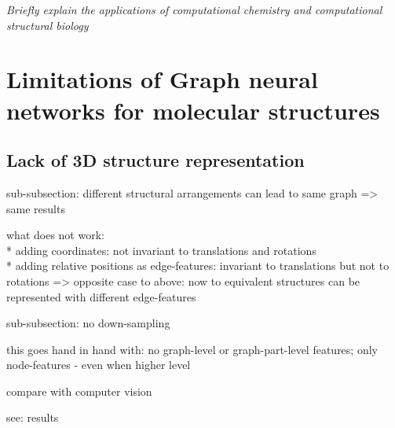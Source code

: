 \textit{Briefly explain the applications of computational chemistry and computational structural biology} 


\section{Limitations of Graph neural networks for molecular structures}

\subsection{Lack of 3D structure representation}

{\itshape
	
sub-subsection: different structural arrangements can lead to same graph => same results

what does not work:\\
* adding coordinates: not invariant to translations and rotations\\
* adding relative positions as edge-features: invariant to translations but not to rotations
=> opposite case to above: now to equivalent structures can be represented with different edge-features

sub-subsection: no down-sampling

this goes hand in hand with: no graph-level or graph-part-level features; only node-features - even when higher level

compare with computer vision

see: results
	}
	
	


